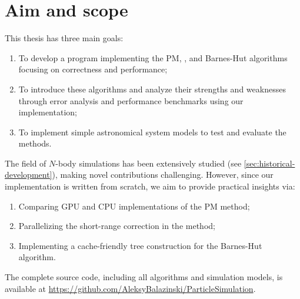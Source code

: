 \section{Aim and scope}
This thesis has three main goals:
\begin{enumerate}
    \item To develop a program implementing the PM, \PThreeM{}, and Barnes-Hut algorithms focusing on correctness and performance;
    \item To introduce these algorithms and analyze their strengths and weaknesses through error analysis and performance benchmarks using our implementation;
    \item To implement simple astronomical system models to test and evaluate the methods.
\end{enumerate}
The field of $N$-body simulations has been extensively studied (see \autoref{sec:historical-development}), making novel contributions challenging.
However, since our implementation is written from scratch, we aim to provide practical insights via:
\begin{enumerate}
    \item Comparing GPU and CPU implementations of the PM method;
    \item Parallelizing the short-range correction in the \PThreeM{} method;
    \item Implementing a cache-friendly tree construction for the Barnes-Hut algorithm.
\end{enumerate}
The complete source code, including all algorithms and simulation models, is available at \url{https://github.com/AleksyBalazinski/ParticleSimulation}.